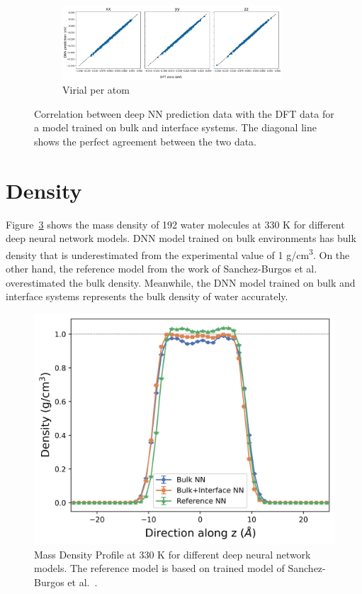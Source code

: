 \begin{figure}[tbhp!]
\begin{subfigure}{0.9\textwidth}
		\includegraphics[width=0.9\textwidth]{images/bulk+interface_NN_on_interface/2_virial_peratom.png}
		\caption{Virial per atom}
		\label{fig:corr_bulk+interface_NN_P}
	\end{subfigure}
	\caption{Correlation between deep NN prediction data with the DFT data for
		a
		model trained on bulk and interface systems. The
		diagonal line shows the perfect agreement between the two data.}
	\label{fig:corr_bulk+interface_NN}
\end{figure}

\section{Density}
Figure~\ref{fig:density} shows the mass density of 192 water molecules at 330 K
for different deep neural network models. DNN model trained on bulk
environments has bulk
density that is underestimated from the experimental value of 1 \unit{
	g/cm^3}. On the other hand, the reference model from the work of
Sanchez-Burgos et
al.~\cite{sanchez2023deep}  overestimated the bulk density. Meanwhile,
the DNN model trained on  bulk and interface systems  represents the
bulk density of water accurately.
\begin{figure}[tbhp!]
	\centering
	\includegraphics[width=0.65\linewidth]{images/density_330.png}
	\caption{Mass Density Profile at 330 K for different deep neural network
		models. The reference model is based on trained model of Sanchez-Burgos et
		al.~\cite{sanchez2023deep}. }
	\label{fig:density}
\end{figure}

